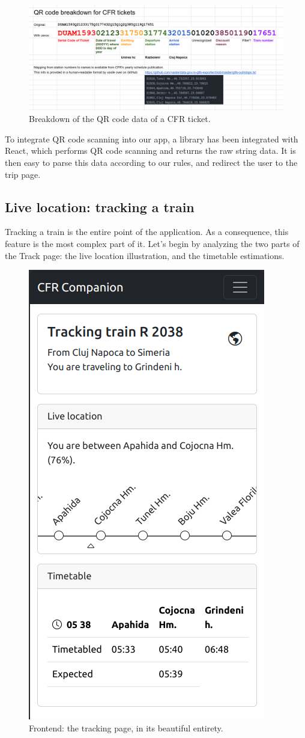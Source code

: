 \begin{figure}[htbp]
    \centering
    \includegraphics[width=1\textwidth]{./figures/ch4_cfr-ticket-breakdown.png}
    \caption{Breakdown of the QR code data of a CFR ticket.}
    \label{FigCfrTicketBreakdown}
\end{figure}

To integrate QR code scanning into our app, a library has been integrated with React, which performs QR code scanning and returns the raw string data. It is then easy to parse this data according to our rules, and redirect the user to the trip page.

\subsection{Live location: tracking a train}
Tracking a train is the entire point of the application. As a consequence, this feature is the most complex part of it. Let's begin by analyzing the two parts of the Track page: the live location illustration, and the timetable estimations.

\begin{figure}[htbp]
    \centering
    \includegraphics[width=.5\textwidth]{./figures/code/fe_track-all.png}
    \caption{Frontend: the tracking page, in its beautiful entirety.}
    \label{FigFeTrackAll}
\end{figure}

